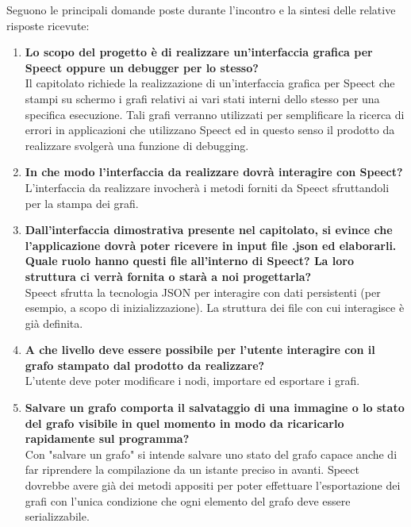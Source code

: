 \documentclass[openany,12pt,a4paper]{article}
\begin{document}
	\noindent Seguono le principali domande poste durante l'incontro e la sintesi delle relative risposte ricevute:
	
	\begin{enumerate}
	
	\item \textbf{Lo scopo del progetto è di realizzare un’interfaccia grafica per Speect oppure un debugger per lo stesso?}\\
	Il capitolato richiede la realizzazione di un'interfaccia grafica per Speect che stampi su schermo i grafi relativi ai vari stati interni dello stesso per una specifica esecuzione. Tali grafi verranno utilizzati per semplificare la ricerca di errori in applicazioni che utilizzano Speect ed in questo senso il prodotto da realizzare svolgerà una funzione di debugging.
    
    \item \textbf{In che modo l'interfaccia da realizzare dovrà interagire con Speect?}\\
    L'interfaccia da realizzare invocherà i metodi forniti da Speect sfruttandoli per la stampa dei grafi.
    
    \item \textbf{Dall'interfaccia dimostrativa presente nel capitolato, si evince che l'applicazione dovrà poter ricevere in input file .json ed elaborarli. Quale ruolo hanno questi file all'interno di Speect? La loro struttura ci verrà fornita o starà a noi progettarla?}\\
    Speect sfrutta la tecnologia JSON per interagire con dati persistenti (per esempio, a scopo di inizializzazione). La struttura dei file con cui interagisce è già definita.
    
    \item \textbf{A che livello deve essere possibile per l'utente interagire con il grafo stampato dal prodotto da realizzare?}\\
    L'utente deve poter modificare i nodi, importare ed esportare i grafi.
	
	\item \textbf{Salvare un grafo comporta il salvataggio di una immagine o lo stato del grafo visibile in quel momento in modo da ricaricarlo rapidamente sul programma?}\\
	Con "salvare un grafo" si intende salvare uno stato del grafo capace anche di far riprendere la compilazione da un istante preciso in avanti. Speect dovrebbe avere già dei metodi appositi per poter effettuare l'esportazione dei grafi con l'unica condizione che ogni elemento del grafo deve essere serializzabile.


\end{enumerate}
\end{document}
